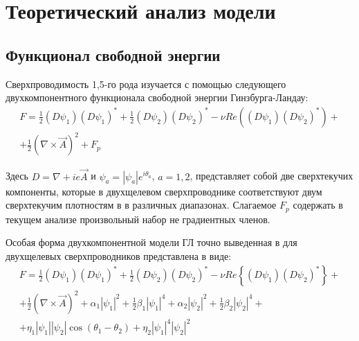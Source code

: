 \chapter{Теоретический анализ модели}

\section{Функционал свободной энергии}

Сверхпроводимость 1,5-го рода изучается с помощью следующего двухкомпонентного 
функционала свободной энергии Гинзбурга-Ландау:
\begin{gather}
    F = \frac{1}{2}(D\psi_1)(D\psi_1)^* + \frac{1}{2}(D\psi_2)(D\psi_2)^* - 
        \nu Re\left( (D\psi_1)(D\psi_2)^* \right) + \nonumber \\
        + \frac{1}{2}\left(\nabla\times\vec{A}\right)^2 + F_p
    \label{eq:1}
\end{gather}

Здесь \( D = \nabla + ie\vec{A} \) и \( \psi_a = |\psi_a|e^{i\theta_a} \), 
\( a = 1,2 \), представляет собой две сверхтекучих компоненты, которые в 
двухщелевом сверхпроводнике соответствуют двум сверхтекучим плотностям в 
в различных диапазонах. Слагаемое \( F_p \) содержать в текущем анализе 
произвольный набор не градиентных членов.

Особая форма двухкомпонентной модели ГЛ точно выведенная в
\cite{bib:8,bib:9,bib:10} для двухщелевых сверхпроводников представлена в виде:
\begin{gather}
    F = \frac{1}{2}(D\psi_1)(D\psi_1)^* + \frac{1}{2}(D\psi_2)(D\psi_2)^* - 
        \nu Re\left\{ (D\psi_1)(D\psi_2)^* \right\} + \nonumber \\
        + \frac{1}{2}\left(\nabla\times\vec{A}\right)^2 + 
        \alpha_1|\psi_1|^2 + \frac{1}{2}\beta_1|\psi_1|^4 + 
        \alpha_2|\psi_2|^2 + \frac{1}{2}\beta_2|\psi_2|^4 + \nonumber \\
        + \eta_1|\psi_1||\psi_2| \cos(\theta_1-\theta_2) + 
        \eta_2|\psi_1|^4|\psi_2|^2
    \label{eq:2}
\end{gather}

